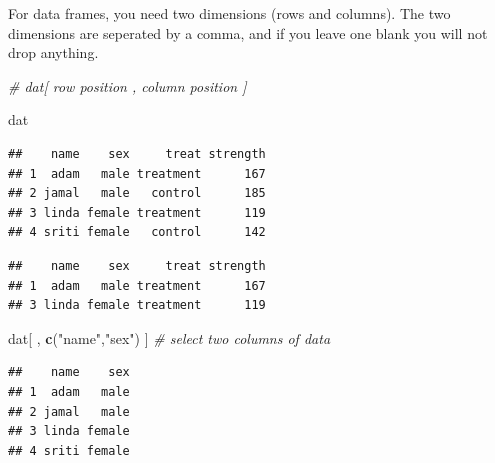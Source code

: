 \documentclass[]{book}
\newenvironment{Shaded}{\begin{snugshade}}{\end{snugshade}}
\newcommand{\CommentTok}[1]{\textcolor[rgb]{0.56,0.35,0.01}{\textit{#1}}}
\newcommand{\KeywordTok}[1]{\textcolor[rgb]{0.13,0.29,0.53}{\textbf{#1}}}
\newcommand{\NormalTok}[1]{#1}
\newcommand{\OperatorTok}[1]{\textcolor[rgb]{0.81,0.36,0.00}{\textbf{#1}}}
\newcommand{\StringTok}[1]{\textcolor[rgb]{0.31,0.60,0.02}{#1}}
\theoremstyle{definition}
\theoremstyle{definition}
\theoremstyle{definition}
\theoremstyle{remark}
\begin{document}
For data frames, you need two dimensions (rows and columns). The two
dimensions are seperated by a comma, and if you leave one blank you will
not drop anything.

\begin{Shaded}
\begin{Highlighting}[]
\CommentTok{# dat[  row position ,  column position  ]}

\NormalTok{dat }
\end{Highlighting}
\end{Shaded}

\begin{verbatim}
##    name    sex     treat strength
## 1  adam   male treatment      167
## 2 jamal   male   control      185
## 3 linda female treatment      119
## 4 sriti female   control      142
\end{verbatim}

\begin{Shaded}
\end{Shaded}

\begin{verbatim}
##    name    sex     treat strength
## 1  adam   male treatment      167
## 3 linda female treatment      119
\end{verbatim}

\begin{Shaded}
\begin{Highlighting}[]
\NormalTok{dat[ , }\KeywordTok{c}\NormalTok{(}\StringTok{"name"}\NormalTok{,}\StringTok{"sex"}\NormalTok{) ]  }\CommentTok{# select two columns of data}
\end{Highlighting}
\end{Shaded}

\begin{verbatim}
##    name    sex
## 1  adam   male
## 2 jamal   male
## 3 linda female
## 4 sriti female
\end{verbatim}

\begin{Shaded}
\end{Shaded}
\end{document}
